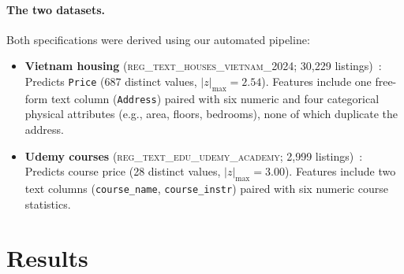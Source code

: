 \documentclass{article}
\begin{document}
\paragraph{The two datasets.} Both specifications were derived using our automated pipeline:
\begin{itemize}
    \item \textbf{Vietnam housing} (\textsc{reg\_text\_houses\_vietnam\_2024}; 30{,}229 listings)~\cite{dataset_vietnam_housing}: Predicts \texttt{Price} (687 distinct values, $|z|_{\max} = 2.54$). Features include one free-form text column (\texttt{Address}) paired with six numeric and four categorical physical attributes (e.g., area, floors, bedrooms), none of which duplicate the address.
    \item \textbf{Udemy courses} (\textsc{reg\_text\_edu\_udemy\_academy}; 2{,}999 listings)~\cite{dataset_udemy_courses}: Predicts course price (28 distinct values, $|z|_{\max} = 3.00$). Features include two text columns (\texttt{course\_name}, \texttt{course\_instr}) paired with six numeric course statistics.
\end{itemize}



\section{Results}
\label{sec:results}
\end{document}
